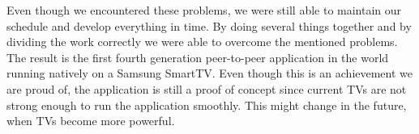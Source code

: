 Even though we encountered these problems, we were still able to maintain our schedule and develop everything in time.
By doing several things together and by dividing the work correctly we were able to overcome the mentioned problems.
 The result is the first fourth generation peer-to-peer application in the world running natively on a Samsung SmartTV.
 Even though this is an achievement we are proud of, the application is still a proof of concept since current TV\textquotesingle s are not strong enough to run the application smoothly.
 This might change in the future, when TV\textquotesingle s become more powerful.
